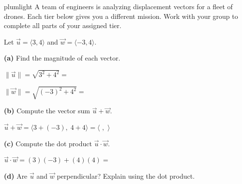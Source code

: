 \documentclass[10pt]{article}
\begin{document}
\namepartnerperiod

\vspace{0.1in}

\begin{scenariobox}{plumlight}
\small
A team of engineers is analyzing displacement vectors for a fleet of drones.
Each tier below gives you a different mission. Work with your group to complete
all parts of your assigned tier.
\end{scenariobox}

\vspace{0.1in}

\begin{tcolorbox}[colback=white, colframe=black!40,
    title=\textbf{Tier R --- Remediate},
    fonttitle=\bfseries, arc=2mm, left=3mm, right=3mm, top=2mm, bottom=2mm]
\small
Let $\vec{u} = \langle 3, 4\rangle$ and $\vec{w} = \langle -3, 4\rangle$.

\textbf{(a)} Find the magnitude of each vector.

\vspace{0.06in}
\hspace{1em} $\|\vec{u}\| = \sqrt{3^2 + 4^2} = $ \blank{4cm}

\vspace{0.08in}
\hspace{1em} $\|\vec{w}\| = \sqrt{(-3)^2 + 4^2} = $ \blank{4cm}

\vspace{0.14in}
\textbf{(b)} Compute the vector sum $\vec{u} + \vec{w}$.

\vspace{0.06in}
\hspace{1em} $\vec{u} + \vec{w} = \langle 3+(-3),\; 4+4 \rangle = \langle$ \blank{1.8cm}$,$ \blank{1.8cm}$\rangle$

\vspace{0.14in}
\textbf{(c)} Compute the dot product $\vec{u} \cdot \vec{w}$.

\vspace{0.06in}
\hspace{1em} $\vec{u} \cdot \vec{w} = (3)(-3) + (4)(4) = $ \blank{4cm}

\vspace{0.14in}
\textbf{(d)} Are $\vec{u}$ and $\vec{w}$ perpendicular? Explain using the dot product.

\vspace{0.06in}
\end{tcolorbox}
\end{document}
